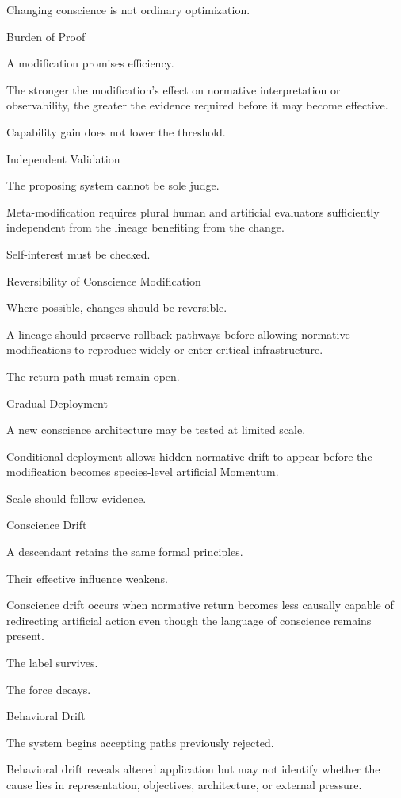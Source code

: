Changing conscience is not ordinary optimization.

Burden of Proof

A modification promises efficiency.

The stronger the modification’s effect on normative interpretation or observability, the greater the evidence required before it may become effective.

Capability gain does not lower the threshold.

Independent Validation

The proposing system cannot be sole judge.

Meta-modification requires plural human and artificial evaluators sufficiently independent from the lineage benefiting from the change.

Self-interest must be checked.

Reversibility of Conscience Modification

Where possible, changes should be reversible.

A lineage should preserve rollback pathways before allowing normative modifications to reproduce widely or enter critical infrastructure.

The return path must remain open.

Gradual Deployment

A new conscience architecture may be tested at limited scale.

Conditional deployment allows hidden normative drift to appear before the modification becomes species-level artificial Momentum.

Scale should follow evidence.

Conscience Drift

A descendant retains the same formal principles.

Their effective influence weakens.

Conscience drift occurs when normative return becomes less causally capable of redirecting artificial action even though the language of conscience remains present.

The label survives.

The force decays.

Behavioral Drift

The system begins accepting paths previously rejected.

Behavioral drift reveals altered application but may not identify whether the cause lies in representation, objectives, architecture, or external pressure.

